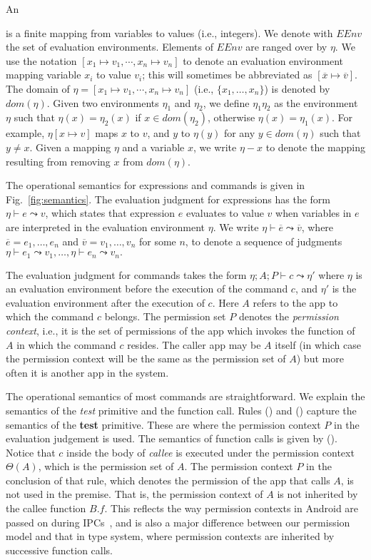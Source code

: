 An {
is a finite mapping from variables to values (i.e., integers).
We denote with $EEnv$ the set of evaluation environments.
Elements of $EEnv$ are ranged over by $\eta$.
We  use the notation
$[ x_1 \mapsto v_1, \cdots,  x_n \mapsto v_n]$
to denote an evaluation environment mapping variable $x_i$ to value $v_i$; this will sometimes be abbreviated as $[ \overline x \mapsto \overline v ].$
The domain of $\eta = [ x_1 \mapsto v_1, \cdots, x_n \mapsto v_n]$ (i.e., $\{x_1,\dots,x_n\}$) is denoted by $dom(\eta)$.
Given two environments $\eta_1$ and $\eta_2$, we define
$\eta_1\eta_2$ as the environment $\eta$ such that $\eta(x) = \eta_2(x)$ if $x \in dom(\eta_2)$,
otherwise $\eta(x) =\eta_1(x)$.
For example, $\eta[x \mapsto v]$ maps $x$ to $v$, and $y$ to $\eta(y)$
for any $y \in dom(\eta)$ such that $y \not = x.$
Given a mapping $\eta$ and a variable $x$, we write $\eta\!-\!x$ to denote the
mapping resulting from removing $x$ from $dom(\eta)$.

The operational semantics for expressions and commands is
given in Fig.~\ref{fig:semantics}.
The evaluation judgment
for expressions has the form $\eta\vdash e\leadsto v$,
which states that expression $e$ evaluates to value $v$ when variables
in $e$ are interpreted in the evaluation environment $\eta.$
We write $\eta \vdash \overline{e} \leadsto \overline{v}$,
where $\overline{e}=e_1,\dots,e_n$ and $\overline{v} = v_1,\dots,v_n$ for some $n$,
to denote a sequence of judgments
$\eta \vdash e_1 \leadsto v_1, \ldots, \eta \vdash e_n \leadsto v_n.$

The evaluation judgment for commands takes the form
$\eta;A;P\vdash c \leadsto \eta'$
where $\eta$ is an evaluation environment before the execution
of the command $c$, and $\eta'$ is the evaluation environment
after the execution of $c$. Here $A$ refers to the app to which the command $c$ belongs.
The permission set $P$ denotes the {\em permission context}, i.e., it is the set of permissions of the app which invokes the function of $A$ in which the command $c$ resides. The caller
app may be $A$ itself (in which case the permission context will be the same as the permission set of $A$) but more often it is another app in the system.

The operational semantics of most commands are straightforward.
We explain the semantics of the \emph{test} primitive and the function call.
Rules () and () capture the semantics of the \textbf{test} primitive.
These are where the permission context $P$ in the evaluation judgement is used.
The semantics of function calls is given by (). 
 Notice that $c$ inside the body of \emph{callee} is executed under
the permission context $\Theta(A)$, which is the permission set of $A$. The permission context $P$
in the conclusion of that rule, which denotes the permission of the app that calls $A$, 
is not used in the premise. That is, the permission context of $A$ is not inherited by 
the callee function $B.f$. This reflects the way permission contexts in Android
are passed on during IPCs~\cite{Android-CheckPerm,Android-Binder-IPC}, and is also a major difference
between our permission model and that in {\BN} type system,
where permission contexts are inherited by successive function calls.

}

